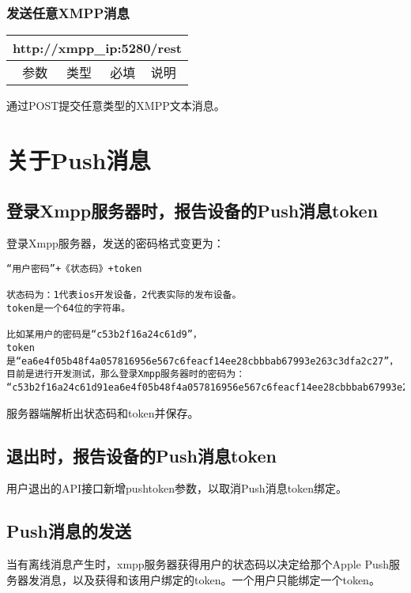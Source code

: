 \documentclass[cs4size]{ctexartutf8}
\begin{document}
\subsubsection{发送任意XMPP消息}

\begin{table}[H]
   \begin{center}
\begin{tabular}{|c|c|c|p{12cm}|}
\hline
\multicolumn{4}{|c|}{http://xmpp\_ip:5280/rest} \\
\hline\hline
 \  参数  & 类型 & 必填 &  说明  \\
\hline
\end{tabular}
   \end{center}
\end{table}

通过POST提交任意类型的XMPP文本消息。


\section{关于Push消息}

\subsection{登录Xmpp服务器时，报告设备的Push消息token}
登录Xmpp服务器，发送的密码格式变更为：

\begin{verbatim}
“用户密码”+《状态码》+token

状态码为：1代表ios开发设备，2代表实际的发布设备。
token是一个64位的字符串。

比如某用户的密码是“c53b2f16a24c61d9”，
token是“ea6e4f05b48f4a057816956e567c6feacf14ee28cbbbab67993e263c3dfa2c27”，
目前是进行开发测试，那么登录Xmpp服务器时的密码为：
“c53b2f16a24c61d91ea6e4f05b48f4a057816956e567c6feacf14ee28cbbbab67993e263c3dfa2c27”。
\end{verbatim}

服务器端解析出状态码和token并保存。


\subsection{退出时，报告设备的Push消息token}

用户退出的API接口新增pushtoken参数，以取消Push消息token绑定。

\subsection{Push消息的发送}
当有离线消息产生时，xmpp服务器获得用户的状态码以决定给那个Apple Push服务器发消息，以及获得和该用户绑定的token。一个用户只能绑定一个token。
\end{document}
